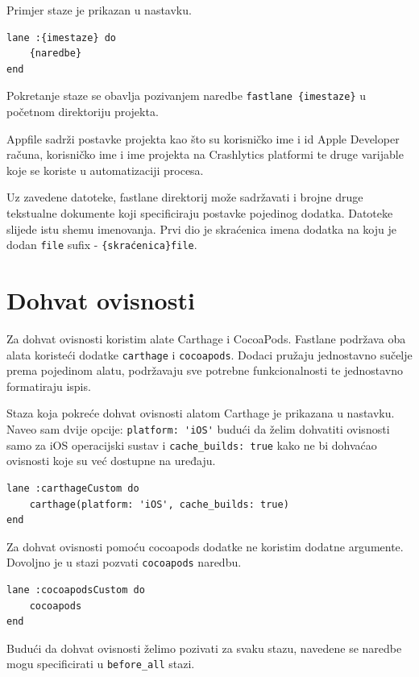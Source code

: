 \documentclass[times, utf8, diplomski, numeric]{fer}
\begin{document}
\begin{appendices}
Primjer staze je prikazan u nastavku.

\begin{verbatim}
lane :{imestaze} do
    {naredbe}
end
\end{verbatim}

Pokretanje staze se obavlja pozivanjem naredbe \verb|fastlane {imestaze}| u početnom direktoriju projekta.

Appfile sadrži postavke projekta kao što su korisničko ime i id Apple Developer računa, korisničko ime i ime projekta na Crashlytics platformi te druge varijable koje se koriste u automatizaciji procesa.

Uz zavedene datoteke, fastlane direktorij može sadržavati i brojne druge tekstualne dokumente koji specificiraju postavke pojedinog dodatka. Datoteke slijede istu shemu imenovanja. Prvi dio je skraćenica imena dodatka na koju je dodan \verb|file| sufix - \verb|{skraćenica}file|.

\section{Dohvat ovisnosti}

Za dohvat ovisnosti koristim alate Carthage i CocoaPods. Fastlane podržava oba alata koristeći dodatke \verb|carthage| i \verb|cocoapods|. Dodaci pružaju jednostavno sučelje prema pojedinom alatu, podržavaju sve potrebne funkcionalnosti te jednostavno formatiraju ispis.

Staza koja pokreće dohvat ovisnosti alatom Carthage je prikazana u nastavku. Naveo sam dvije opcije: \verb|platform: 'iOS'| budući da želim dohvatiti ovisnosti samo za iOS operacijski sustav i \verb|cache_builds: true| kako ne bi dohvaćao ovisnosti koje su već dostupne na uređaju.

\begin{verbatim}
lane :carthageCustom do
    carthage(platform: 'iOS', cache_builds: true)
end
\end{verbatim}

Za dohvat ovisnosti pomoću cocoapods dodatke ne koristim dodatne argumente. Dovoljno je u stazi pozvati \verb|cocoapods| naredbu.

\begin{verbatim}
lane :cocoapodsCustom do
    cocoapods
end
\end{verbatim}

Budući da dohvat ovisnosti želimo pozivati za svaku stazu, navedene se naredbe mogu specificirati u \verb|before_all| stazi.


\end{appendices}
\end{document}
